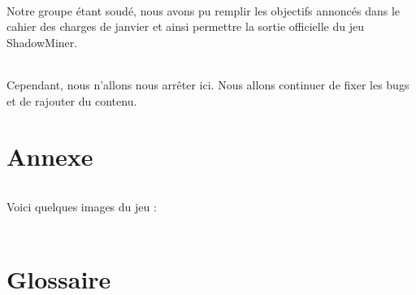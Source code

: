 \documentclass[titlepage, 13px, a4paper]{report}
\begin{document}
\paragraph{} \hspace{0pt}
Notre groupe étant soudé, nous avons pu remplir les objectifs annoncés dans le cahier des 
charges de janvier et ainsi permettre la sortie officielle du jeu ShadowMiner. \\

\paragraph{} \hspace{0pt}
Cependant, nous n’allons nous arrêter ici. Nous allons continuer de fixer les bugs 
et de rajouter du contenu. \\



\newpage

\newpage


\part{Annexe}
\paragraph{} \hspace{0pt}
Voici quelques images du jeu : \\ \\




\part{Glossaire}
\paragraph{} \hspace{0pt}


\end{document}
